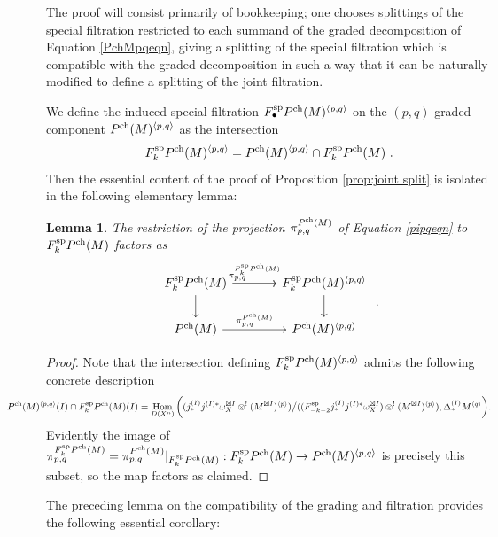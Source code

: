 \documentclass[11pt]{amsart}
\numberwithin{equation}{section}
\newtheorem{lemma}[theo]{Lemma}
\theoremstyle{definition}
\newcommand{\spe}{{\textup{sp}}}
\DeclareMathOperator{\Hom}{Hom}
\newcommand{\ch}{{\textup{ch}}}
\newcommand{\0}{{\textbf{0}}}
\newcommand{\DD}{{D}}
\def\ch{{\rm ch}}
\begin{document}
The proof will consist primarily of bookkeeping; one chooses splittings of the special filtration restricted to each summand of the graded decomposition of Equation \ref{PchMpqeqn}, giving a splitting of the special filtration which is compatible with the graded decomposition in such a way that it can be naturally modified to define a splitting of the joint filtration.



We define the induced special filtration $ F_\bullet^\spe P^\ch(M)^{\langle p,q \rangle}$ on the $(p,q)$-graded component $P^\ch(M)^{\langle p,q \rangle}$ as the intersection
\[ 
F_k^\spe P^\ch(M)^{\langle p,q \rangle} = P^\ch(M)^{\langle p,q \rangle} \cap F_k^\spe P^\ch(M) \ . 
\] 
Then the essential content of the proof of Proposition \ref{prop:joint split} is isolated in the following elementary lemma:

\begin{lemma}\label{splitlemma} The restriction of the projection $\pi_{p,q}^{P^\ch(M)}$ of Equation \ref{pipqeqn} to $F_k^\spe P^\ch(M)$ factors as
	\[ 
	\begin{tikzcd}[column sep=large] F_k^\spe P^\ch(M) \arrow[r,"\pi_{p,q}^{F_k^\spe P^\ch(M) }"]\arrow[d] \arrow[r] & F_k^\spe P^\ch(M)^{\langle p,q \rangle }\arrow[d]  \\
		P^\ch(M) \arrow[r,"\pi_{p,q}^{P^\ch(M)}"]  & P^\ch(M)^{\langle p,q \rangle } 
		 \end{tikzcd} \ . 
		 \]
\end{lemma}
\begin{proof}
	Note that the intersection defining $F_k^\spe P^\ch(M)^{\langle p,q \rangle }$ admits the following concrete description
\[	
{\hspace{-1.5cm}}
P^\ch(M)^{\langle p,q \rangle}(I) \cap F_k^\spe P^\ch(M)(I) = \Hom_{\DD(X^n)}\bigg((j^{(I)}_*j^{(I)*}\omega_{X}^{\boxtimes I}\otimes^! (M^{\boxtimes I})^{\langle p \rangle} )\big/ ((F_{-k-2}^\spe j^{(I)}_*j^{(I)*}\omega_{X}^{\boxtimes I}) \otimes^! (M^{\boxtimes I})^{\langle p \rangle}), \Delta^{(I)}_*M^{\langle q \rangle} \bigg)   .
\]
Evidently the image of $\pi_{p,q}^{F_k^\spe P^\ch(M)}=\pi_{p,q}^{P^\ch(M)}|_{F_k^\spe P^\ch(M)}:F_k^\spe P^\ch(M) \to P^\ch(M)^{\langle p,q \rangle}$ is precisely this subset, so the map factors as claimed.
\end{proof}

The preceding lemma on the compatibility of the grading and filtration provides the following essential corollary:
\end{document}

